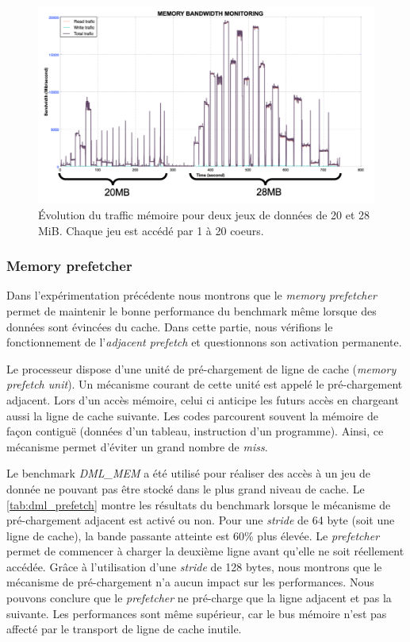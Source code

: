         \begin{figure}
        \center
        \includegraphics[width=14cm]{images/dml_bw_cacheL3.png}
        \caption{\label{pic:dml_bw_cacheL3} Évolution du traffic mémoire pour deux jeux de données de 20 et 28 MiB. Chaque jeu est accédé par 1 à 20 coeurs.}
        \end{figure}
        
        

    \subsubsection{Memory prefetcher}
        
        Dans l'expérimentation précédente nous montrons que le \textit{memory prefetcher} permet de maintenir le bonne performance du benchmark même lorsque des données sont évincées du cache. Dans cette partie, nous vérifions le fonctionnement de l'\textit{adjacent prefetch} et questionnons son activation permanente. 
        
        Le processeur dispose d'une unité de pré-chargement de ligne de cache (\textit{memory prefetch unit}). Un mécanisme courant de cette unité est appelé le pré-chargement adjacent. Lors d'un accès mémoire, celui ci anticipe les futurs accès en chargeant aussi la ligne de cache suivante. Les codes parcourent souvent la mémoire de façon contiguë (données d'un tableau, instruction d'un programme). Ainsi, ce mécanisme permet d'éviter un grand nombre de \textit{miss}.
        
        Le benchmark \textit{DML\_MEM} a été utilisé pour réaliser des accès à un jeu de donnée ne pouvant pas être stocké dans le plus grand niveau de cache. Le \autoref{tab:dml_prefetch} montre les résultats du benchmark lorsque le mécanisme de pré-chargement adjacent est activé ou non. Pour une \textit{stride} de 64 byte (soit une ligne de cache), la bande passante atteinte est 60\% plus élevée. Le \textit{prefetcher} permet de commencer à charger la deuxième ligne avant qu'elle ne soit réellement accédée. Grâce à l'utilisation d'une \textit{stride} de 128 bytes, nous montrons que le mécanisme de pré-chargement n'a aucun impact sur les performances. Nous pouvons conclure que le \textit{prefetcher} ne pré-charge que la ligne adjacent et pas la suivante. Les performances sont même supérieur, car le bus mémoire n'est pas affecté par le transport de ligne de cache inutile. 
        
